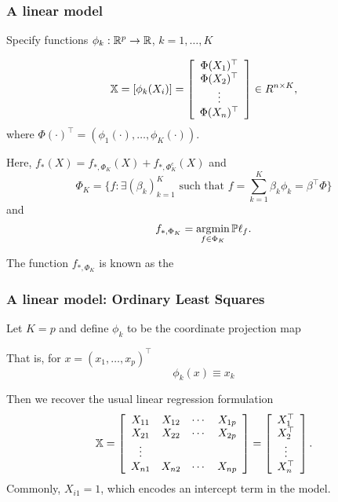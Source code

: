 \documentclass{beamer}
\begin{document}
\begin{frame}
\frametitle{A linear model}
Specify 
functions $\phi_k:\mathbb{R}^p \rightarrow \mathbb{R}$, $k=1,\ldots,K$

\[
\mathbb{X} = 
\left[
\phi_k(X_i)
\right]
=
\left[
\begin{array}{c}
\Phi(X_{1})^{\top} \\
\Phi(X_{2})^{\top} \\
\vdots    \\
\Phi(X_{n})^{\top} \\
\end{array}
\right]
 \in R^{n\times K},
\]
where $\Phi(\cdot)^{\top} = (\phi_1(\cdot), \ldots, \phi_K(\cdot))$.
\vsp

Here,  $f_*(X) = f_{*,\Phi_K}(X)  + f_{*,\Phi_K^c}(X)$ and
\[
\Phi_K = \{ f : \exists (\beta_k)_{k=1}^K \textrm{ such that } f = \sum_{k=1}^K \beta_k \phi_k = \beta^{\top} \Phi\}
\]
and 
\[
f_{*,\Phi_K} = \operatorname*{\arg\!\min}_{f \in \Phi_K} \mathbb{P}\ell_f.
\]

\vsp
The function $f_{*,\Phi_K}$ is known as the 
\end{frame}

%
%
%

\begin{frame}
\frametitle{A linear model: Ordinary Least Squares}
Let $K = p$ and define $\phi_k$ to be the coordinate projection map
\vsp

 That is, for $x = (x_1,\ldots,x_p)^{\top}$
 \[
 \phi_k(x) \equiv x_k
 \]
 \vsp
 
 Then we recover the usual linear regression formulation
\[
\mathbb{X} = 
\left[
\begin{array}{cccc}
X_{11} & X_{12} & \cdots & X_{1p} \\
X_{21} & X_{22} & \cdots & X_{2p} \\
\vdots & & \\
X_{n1} & X_{n2} & \cdots & X_{np} \\
\end{array}
\right]
=
\left[
\begin{array}{cccc}
X_{1}^{\top} \\
X_{2}^{\top} \\
\vdots    \\
X_{n}^{\top} \\
\end{array}
\right].
\]
Commonly, $X_{i1} = 1$, which encodes an intercept term in the model.
\end{frame}
\end{document}

